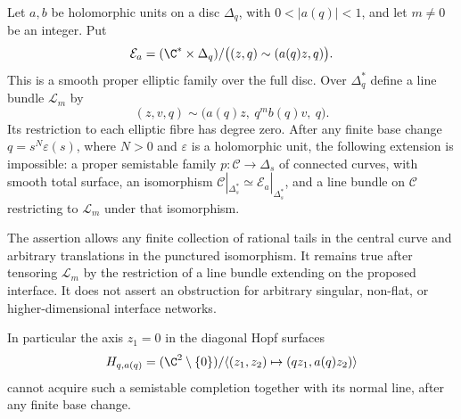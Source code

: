 \begin{proposition}\label{push:src:B.4.8}
Let $a,b$ be holomorphic units on a disc $\Delta_q$, with
$0<|a(q)|<1$, and let $m\ne0$ be an integer.  Put
\[
 \mathcal E_a=(\C^*\times\Delta_q)/
       \bigl((z,q)\sim(a(q)z,q)\bigr).
\]
This is a smooth proper elliptic family over the full disc.
Over $\Delta_q^*$ define a line bundle $\mathcal L_m$ by
\[
 (z,v,q)\sim\bigl(a(q)z,\ q^m b(q)v,\ q\bigr).
\]
Its restriction to each elliptic fibre has degree zero.
After any finite base change $q=s^N\varepsilon(s)$, where
$N>0$ and $\varepsilon$ is a holomorphic unit, the following
extension is impossible: a proper semistable family
$p:\mathcal C\to\Delta_s$ of connected curves, with smooth
total surface, an isomorphism
$\mathcal C|_{\Delta_s^*}\simeq\mathcal E_a|_{\Delta_s^*}$,
and a line bundle on $\mathcal C$ restricting to
$\mathcal L_m$ under that isomorphism.

The assertion allows any finite collection of rational tails
in the central curve and arbitrary translations in the
punctured isomorphism.  It remains true after tensoring
$\mathcal L_m$ by the restriction of a line bundle extending
on the proposed interface.  It does not assert an obstruction
for arbitrary singular, non-flat, or higher-dimensional
interface networks.

In particular the axis $z_1=0$ in the diagonal Hopf surfaces
\[
 H_{q,a(q)}=(\C^2\setminus\{0\})/
       \langle(z_1,z_2)\mapsto(qz_1,a(q)z_2)\rangle
\]
cannot acquire such a semistable completion together with
its normal line, after any finite base change.
\end{proposition}
